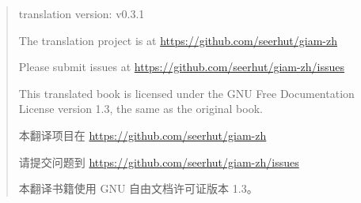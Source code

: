 \rule{0pt}{0pt}

\vfill

\begin{quote}
    translation version: v0.3.1

    The translation project is at \newline\url{https://github.com/seerhut/giam-zh} 

    Please submit issues at \newline\url{https://github.com/seerhut/giam-zh/issues}

    This translated book is licensed under the GNU Free Documentation License version 1.3, the same as the original book.

    本翻译项目在 \url{https://github.com/seerhut/giam-zh}

    请提交问题到 \url{https://github.com/seerhut/giam-zh/issues}

    本翻译书籍使用 GNU 自由文档许可证版本 1.3。
\end{quote}




\vfill